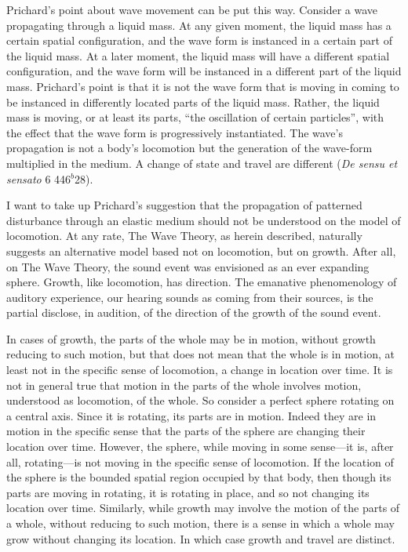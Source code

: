 Prichard's point about wave movement can be put this way. Consider a wave propagating through a liquid mass. At any given moment, the liquid mass has a certain spatial configuration, and the wave form is instanced in a certain part of the liquid mass. At a later moment, the liquid mass will have a different spatial configuration, and the wave form will be instanced in a different part of the liquid mass. Prichard's point is that it is not the wave form that is moving in coming to be instanced in differently located parts of the liquid mass. Rather, the liquid mass is moving, or at least its parts, ``the oscillation of certain particles'', with the effect that the wave form is progressively instantiated. The wave's propagation is not a body's locomotion but the generation of the wave-form multiplied in the medium. A change of state and travel are different (\emph{De sensu et sensato} 6 446\( ^{b} \)28).

I want to take up Prichard's suggestion that the propagation of patterned disturbance through an elastic medium should not be understood on the model of locomotion. At any rate, The Wave Theory, as herein described, naturally suggests an alternative model based not on locomotion, but on growth. After all, on The Wave Theory, the sound event was envisioned as an ever expanding sphere. Growth, like locomotion, has direction. The emanative phenomenology of auditory experience, our hearing sounds as coming from their sources, is the partial disclose, in audition, of the direction of the growth of the sound event.

In cases of growth, the parts of the whole may be in motion, without growth reducing to such motion, but that does not mean that the whole is in motion, at least not in the specific sense of locomotion, a change in location over time. It is not in general true that motion in the parts of the whole involves motion, understood as locomotion, of the whole. So consider a perfect sphere rotating on a central axis. Since it is rotating, its parts are in motion. Indeed they are in motion in the specific sense that the parts of the sphere are changing their location over time. However, the sphere, while moving in some sense---it is, after all, rotating---is not moving in the specific sense of locomotion. If the location of the sphere is the bounded spatial region occupied by that body, then though its parts are moving in rotating, it is rotating in place, and so not changing its location over time. Similarly, while growth may involve the motion of the parts of a whole, without reducing to such motion, there is a sense in which a whole may grow without changing its location. In which case growth and travel are distinct.

